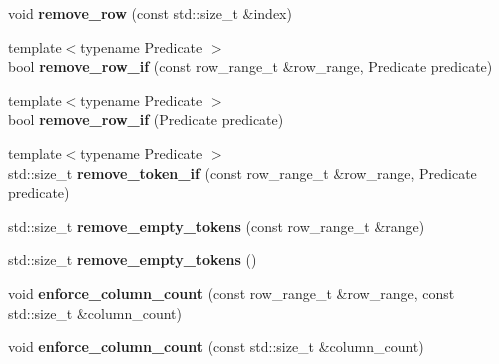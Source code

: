 \begin{DoxyCompactItemize}
\item 
\hypertarget{classstrtk_1_1token__grid_affbc5505d5f55c0c771e93b5c9456062}{void {\bfseries remove\-\_\-row} (const std\-::size\-\_\-t \&index)}\label{classstrtk_1_1token__grid_affbc5505d5f55c0c771e93b5c9456062}

\item 
\hypertarget{classstrtk_1_1token__grid_a27feac6693515a87afd47bdc6122579b}{{\footnotesize template$<$typename Predicate $>$ }\\bool {\bfseries remove\-\_\-row\-\_\-if} (const row\-\_\-range\-\_\-t \&row\-\_\-range, Predicate predicate)}\label{classstrtk_1_1token__grid_a27feac6693515a87afd47bdc6122579b}

\item 
\hypertarget{classstrtk_1_1token__grid_aa2bb0fd9baea92ef9c278f3497aa90c5}{{\footnotesize template$<$typename Predicate $>$ }\\bool {\bfseries remove\-\_\-row\-\_\-if} (Predicate predicate)}\label{classstrtk_1_1token__grid_aa2bb0fd9baea92ef9c278f3497aa90c5}

\item 
\hypertarget{classstrtk_1_1token__grid_a43a977d51545719381411a184eda0d2b}{{\footnotesize template$<$typename Predicate $>$ }\\std\-::size\-\_\-t {\bfseries remove\-\_\-token\-\_\-if} (const row\-\_\-range\-\_\-t \&row\-\_\-range, Predicate predicate)}\label{classstrtk_1_1token__grid_a43a977d51545719381411a184eda0d2b}

\item 
\hypertarget{classstrtk_1_1token__grid_a0f5c1cb46d952fe483bba3146d5dae9e}{std\-::size\-\_\-t {\bfseries remove\-\_\-empty\-\_\-tokens} (const row\-\_\-range\-\_\-t \&range)}\label{classstrtk_1_1token__grid_a0f5c1cb46d952fe483bba3146d5dae9e}

\item 
\hypertarget{classstrtk_1_1token__grid_a4156b906737d0c04ae48cb3250b2125d}{std\-::size\-\_\-t {\bfseries remove\-\_\-empty\-\_\-tokens} ()}\label{classstrtk_1_1token__grid_a4156b906737d0c04ae48cb3250b2125d}

\item 
\hypertarget{classstrtk_1_1token__grid_ae4b3714e4266deb370910c80f1aafcdf}{void {\bfseries enforce\-\_\-column\-\_\-count} (const row\-\_\-range\-\_\-t \&row\-\_\-range, const std\-::size\-\_\-t \&column\-\_\-count)}\label{classstrtk_1_1token__grid_ae4b3714e4266deb370910c80f1aafcdf}

\item 
\hypertarget{classstrtk_1_1token__grid_a5c52a50c4b116e2796af2d0c47cd3e98}{void {\bfseries enforce\-\_\-column\-\_\-count} (const std\-::size\-\_\-t \&column\-\_\-count)}\label{classstrtk_1_1token__grid_a5c52a50c4b116e2796af2d0c47cd3e98}


\end{DoxyCompactItemize}
